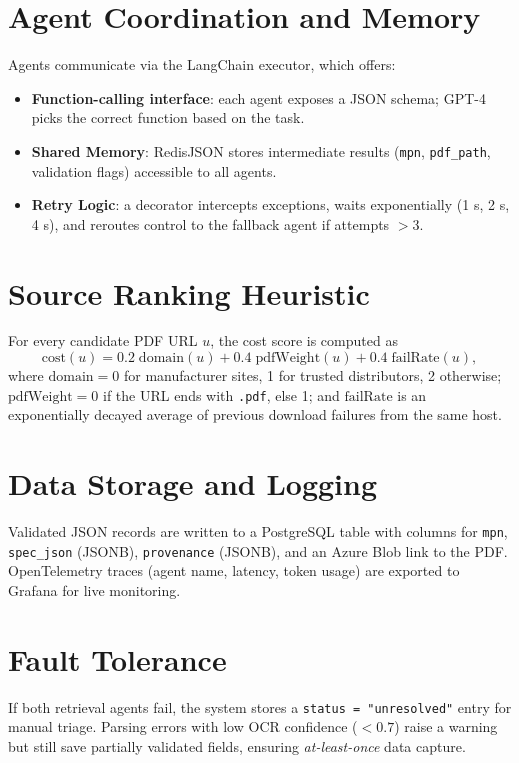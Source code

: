 \section{Agent Coordination and Memory}
Agents communicate via the LangChain executor, which offers:  
\begin{itemize}
  \item \textbf{Function-calling interface}: each agent exposes a JSON schema; GPT-4 picks the correct function based on the task.  
  \item \textbf{Shared Memory}: RedisJSON stores intermediate results (\verb|mpn|, \verb|pdf_path|, validation flags) accessible to all agents.  
  \item \textbf{Retry Logic}: a decorator intercepts exceptions, waits exponentially (1 s, 2 s, 4 s), and reroutes control to the fallback agent if attempts $>3$.
\end{itemize}

\section{Source Ranking Heuristic}
For every candidate PDF URL $u$, the cost score is computed as
\begin{equation}
\label{eq:heuristic}
\mathrm{cost}(u)=0.2\;\mathrm{domain}(u)+0.4\;\mathrm{pdfWeight}(u)+0.4\;\mathrm{failRate}(u),
\end{equation}
where \(\mathrm{domain}=0\) for manufacturer sites, 1 for trusted distributors, 2 otherwise;  
\(\mathrm{pdfWeight}=0\) if the URL ends with \texttt{.pdf}, else 1;  
and \(\mathrm{failRate}\) is an exponentially decayed average of previous download failures from the same host.

\section{Data Storage and Logging}
Validated JSON records are written to a PostgreSQL table with columns for \verb|mpn|, \verb|spec_json| (JSONB), \verb|provenance| (JSONB), and an Azure Blob link to the PDF.  
OpenTelemetry traces (agent name, latency, token usage) are exported to Grafana for live monitoring.

\section{Fault Tolerance}
If both retrieval agents fail, the system stores a \verb|status = "unresolved"| entry for manual triage.  
Parsing errors with low OCR confidence ($<0.7$) raise a warning but still save partially validated fields, ensuring \emph{at-least-once} data capture.

